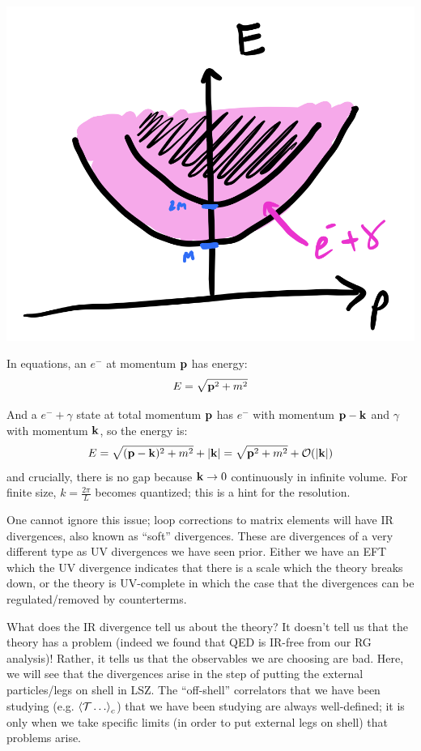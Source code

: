\begin{center}
    \includegraphics[scale=0.35]{Lectures/Images/lec14-nogap.png}
\end{center}

In equations, an $e^-$ at momentum $\mathbf{p}$ has energy:
\begin{equation}
    E = \sqrt{\mathbf{p}^2 + m^2}
\end{equation}

And a $e^- + \gamma$ state at total momentum $\mathbf{p}$ has $e^-$ with momentum $\mathbf{p} - \mathbf{k}$ and $\gamma$ with momentum $\mathbf{k}$, so the energy is:
\begin{equation}
    E = \sqrt{(\mathbf{p}-\mathbf{k})^2 + m^2} + \lvert \mathbf{k} \rvert = \sqrt{\mathbf{p}^2 + m^2} + \mathcal{O}(\lvert \mathbf{k} \rvert)
\end{equation}
and crucially, there is no gap because $\mathbf{k} \to 0$ continuously in infinite volume. For finite size, $k = \frac{2\pi}{L}$ becomes quantized; this is a hint for the resolution.

One cannot ignore this issue; loop corrections to matrix elements will have IR divergences, also known as ``soft'' divergences. These are divergences of a very different type as UV divergences we have seen prior. Either we have an EFT which the UV divergence indicates that there is a scale which the theory breaks down, or the theory is UV-complete in which the case that the divergences can be regulated/removed by counterterms.

What does the IR divergence tell us about the theory? It doesn't tell us that the theory has a problem (indeed we found that QED is IR-free from our RG analysis)! Rather, it tells us that the observables we are choosing are bad. Here, we will see that the divergences arise in the step of putting the external particles/legs on shell in LSZ. The ``off-shell'' correlators that we have been studying (e.g. $\left< \mathcal{T}\ldots \right>_c$) that we have been studying are always well-defined; it is only when we take specific limits (in order to put external legs on shell) that problems arise. 

